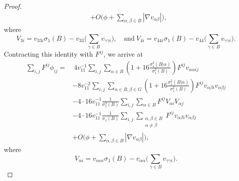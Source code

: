 \documentclass[11pt]{amsart}
\numberwithin{theorem}{section}
\numberwithin{equation}{section}
\begin{document}
\begin{proof}
\begin{align*}
&+O\bigg(\phi+\sum_{\alpha,\beta\in B}|\nabla v_{\alpha\beta}|\bigg),
\end{align*}
where $$V_{3i}=v_{33i}\sigma_1(B)-v_{33}\bigg(\sum_{\gamma\in B}v_{\gamma\gamma i}\bigg),\quad\mathrm{and}\ V_{4i}=v_{44i}\sigma_1(B)-v_{44}\bigg(\sum_{\gamma\in B}v_{\gamma\gamma i}\bigg).$$ Contracting this identity with $F^{ij}$, we arrive at
\begin{equation}\label{Equality-F1-2}
\begin{aligned}
\sum_{i,j}F^{ij}\phi_{ij}
=&~4v_{11}^{-1}\sum_{i,j}\sum_{\alpha\in B}\left(1+16\frac{\sigma_1^2(B|\alpha)}{\sigma_1^2(B)}\right)F^{ij}v_{\alpha\alpha ij}\\
&-8v_{11}^{-2}\sum_{i,j}\sum_{\alpha\in B,\beta\in G}\left(1+16\frac{\sigma_1^2(B|\alpha)}{\sigma_1^2(B)}\right)F^{ij}v_{\alpha\beta i}v_{\alpha\beta j}\\
&-4\cdot 16v_{11}^{-1}\frac{1}{\sigma_1^3(B)}\sum_{i,j}\sum_{\alpha\in B}F^{ij}V_{\alpha i}V_{\alpha j}\\
&-4\cdot16v_{11}^{-1}\frac{1}{\sigma_1(B)}\sum_{i,j}\sum_{\substack{\alpha,\beta\in B\\ \alpha\neq\beta}}F^{ij}v_{\alpha\beta i}v_{\alpha\beta j}\\
&+O\bigg(\phi+\sum_{\alpha,\beta\in B}|\nabla v_{\alpha\beta}|\bigg),
\end{aligned}
\end{equation}
where $$V_{\alpha i}=v_{\alpha\alpha i}\sigma_1(B) -v_{\alpha\alpha}\bigg( \sum_{\gamma\in B}v_{\gamma\gamma i}\bigg).$$
 

\end{proof}
\end{document}
